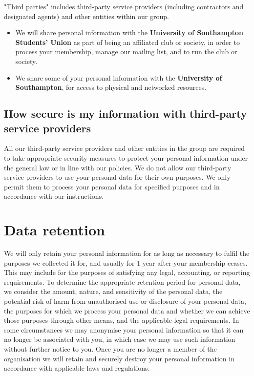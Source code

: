 \documentclass[12pt]{article}
\begin{document}
"Third parties" includes third-party service providers (including contractors and designated agents) and other entities within our group. 
\begin{itemize}
\item We will share personal information with the \textbf{University of Southampton Students’ Union} as part of being an affiliated club or society, in order to process your membership, manage our mailing list, and to run the club or society.
\item We share some of your personal information with the \textbf{University of Southampton}, for access to physical and networked resources.
\end{itemize}

\subsection{How secure is my information with third-party service providers}

All our third-party service providers and other entities in the group are required to take appropriate security measures to protect your personal information under the general law or in line with our policies. We do not allow our third-party service providers to use your personal data for their own purposes. We only permit them to process your personal data for specified purposes and in accordance with our instructions.

\section{Data retention}
We will only retain your personal information for as long as necessary to fulfil the purposes we collected it for, and usually for 1 year after your membership ceases. This may include for the purposes of satisfying any legal, accounting, or reporting requirements. To determine the appropriate retention period for personal data, we consider the amount, nature, and sensitivity of the personal data, the potential risk of harm from unauthorised use or disclosure of your personal data, the purposes for which we process your personal data and whether we can achieve those purposes through other means, and the applicable legal requirements. 
In some circumstances we may anonymise your personal information so that it can no longer be associated with you, in which case we may use such information without further notice to you. Once you are no longer a member of the organisation we will retain and securely destroy your personal information in accordance with applicable laws and regulations.
\end{document}
